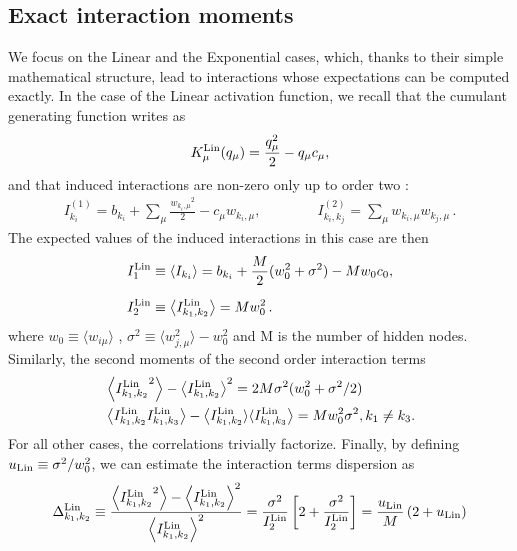 \documentclass[11pt,letterpaper]{article}
\renewcommand{\red}[1]{#1}
\begin{document}
\subsection{Exact interaction moments}
\label{3.1}
We focus on the Linear and the Exponential cases, which, thanks to their simple mathematical structure, {\red lead to interactions whose expectations} can be computed exactly. 
In the case of the Linear activation function, we recall that the cumulant generating function writes as  
\begin{equation*}
K^{\rm Lin}_{\mu}(q_{\mu}) = \frac{q^2_{\mu}}{2}-q_{\mu} c_{\mu},
\end{equation*}
and that induced interactions are non-zero only up to order two \cite{10.1162/neco_a_01420}:
\begin{equation}
\begin{aligned}
I^{(1)}_{k_i} = b_{k_i} +\sum_{\mu} \frac{{w_{k_i,\mu}}^2}{2}-c_{\mu} w_{k_i,\mu}, \qquad \qquad 
I^{(2)}_{k_i,k_j} =\sum_{\mu} w_{k_i,\mu}w_{k_j,\mu}\, .
\end{aligned}
\end{equation} 
The expected values of the induced interactions in this case are then
\begin{equation}
\begin{aligned}
I^{\rm Lin}_1 &\equiv \langle I_{k_i} \rangle 
= b_{k_i} + \frac{M}{2}(w_0^2 + \sigma^2) - M w_0 c_0, \\[6pt]
I^{\rm Lin}_2 &\equiv \left\langle I^{\rm Lin}_{k_1,k_2} \right\rangle 
= M w_0^2 \, .
\end{aligned}
\label{eq:lin_exact}
\end{equation}
where $w_0\equiv\langle w_{i\mu}\rangle$ , $\sigma^2 \equiv \langle w^2_{j,\mu}\rangle - w^2_0 $ and M is the number of hidden nodes.
Similarly, the second moments of the second order interaction terms
\begin{align*}
&\left \langle {I^{\rm Lin}_{k_1,k_2}}^2 \right \rangle - \left \langle I^{\rm Lin}_{k_1,k_2} \right \rangle^2  = 2M \sigma^2(w_0^2 + \sigma^2/2)\\
&\left \langle I^{\rm Lin}_{k_1,k_2} I^{\rm Lin}_{k_1,k_3} \right \rangle - \left \langle I^{\rm Lin}_{k_1,k_2}\rangle \langle I^{\rm Lin}_{k_1,k_3} \right \rangle = Mw_0^2 \sigma^2, k_1\neq k_3.
\end{align*}
For all other cases, the correlations trivially factorize. Finally, by defining  $u_{\rm Lin}\equiv\sigma^2/w_0^2$, we can estimate the interaction terms dispersion as
\begin{equation*}
\Delta^{\rm Lin}_{k_1,k_2} \equiv \frac{\left \langle {I^{\rm Lin}_{k_1,k_2}}^2 \right \rangle - \left \langle I^{\rm Lin}_{k_1,k_2} \right \rangle^2}{\left \langle I^{\rm Lin}_{k_1,k_2} \right \rangle^2} = \frac{\sigma^2}{I^{\rm Lin}_{2}}\left [ 2+\frac{\sigma^2}{I^{\rm Lin}_{2}}\right] = \frac{u_{\rm Lin}}{M}\left(2+u_{\rm Lin}\right) 
\end{equation*}
\end{document}
